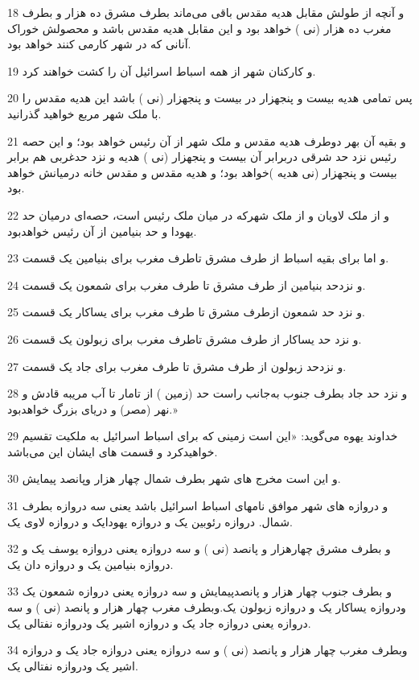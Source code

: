 \par 18 و آنچه از طولش مقابل هدیه مقدس باقی می‌ماند بطرف مشرق ده هزار و بطرف مغرب ده هزار (نی ) خواهد بود و این مقابل هدیه مقدس باشد و محصولش خوراک آنانی که در شهر کارمی کنند خواهد بود.
\par 19 و کارکنان شهر از همه اسباط اسرائیل آن را کشت خواهند کرد.
\par 20 پس تمامی هدیه بیست و پنجهزار در بیست و پنجهزار (نی ) باشد این هدیه مقدس را با ملک شهر مربع خواهید گذرانید.
\par 21 و بقیه آن بهر دوطرف هدیه مقدس و ملک شهر از آن رئیس خواهد بود؛ و این حصه رئیس نزد حد شرقی دربرابر آن بیست و پنجهزار (نی ) هدیه و نزد حدغربی هم برابر بیست و پنجهزار (نی هدیه )خواهد بود؛ و هدیه مقدس و مقدس خانه درمیانش خواهد بود.
\par 22 و از ملک لاویان و از ملک شهر‌که در میان ملک رئیس است، حصه‌ای درمیان حد یهودا و حد بنیامین از آن رئیس خواهدبود.
\par 23 و اما برای بقیه اسباط از طرف مشرق تاطرف مغرب برای بنیامین یک قسمت.
\par 24 و نزدحد بنیامین از طرف مشرق تا طرف مغرب برای شمعون یک قسمت.
\par 25 و نزد حد شمعون ازطرف مشرق تا طرف مغرب برای یساکار یک قسمت.
\par 26 و نزد حد یساکار از طرف مشرق تاطرف مغرب برای زبولون یک قسمت.
\par 27 و نزدحد زبولون از طرف مشرق تا طرف مغرب برای جاد یک قسمت.
\par 28 و نزد حد جاد بطرف جنوب به‌جانب راست حد (زمین ) از تامار تا آب مریبه قادش و نهر (مصر) و دریای بزرگ خواهدبود.»
\par 29 خداوند یهوه می‌گوید: «این است زمینی که برای اسباط اسرائیل به ملکیت تقسیم خواهیدکرد و قسمت های ایشان این می‌باشد.
\par 30 و این است مخرج های شهر بطرف شمال چهار هزار وپانصد پیمایش.
\par 31 و دروازه های شهر موافق نامهای اسباط اسرائیل باشد یعنی سه دروازه بطرف شمال. دروازه رئوبین یک و دروازه یهودایک و دروازه لاوی یک.
\par 32 و بطرف مشرق چهارهزار و پانصد (نی ) و سه دروازه یعنی دروازه یوسف یک و دروازه بنیامین یک و دروازه دان یک.
\par 33 و بطرف جنوب چهار هزار و پانصدپیمایش و سه دروازه یعنی دروازه شمعون یک ودروازه یساکار یک و دروازه زبولون یک.وبطرف مغرب چهار هزار و پانصد (نی ) و سه دروازه یعنی دروازه جاد یک و دروازه اشیر یک ودروازه نفتالی یک.
\par 34 وبطرف مغرب چهار هزار و پانصد (نی ) و سه دروازه یعنی دروازه جاد یک و دروازه اشیر یک ودروازه نفتالی یک.





